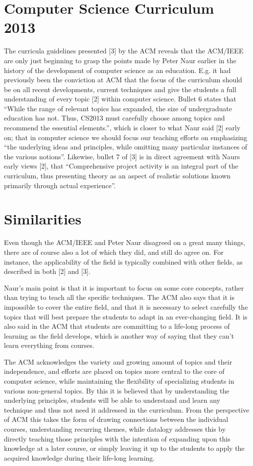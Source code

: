 \documentclass{article}
\begin{document}
\section{Computer Science Curriculum 2013}
The curricula guidelines presented [3] by the ACM reveals that the ACM/IEEE are only just beginning to grasp the points
made by Peter Naur earlier in the history of the development of computer science as an education. E.g. it had previously
been the conviction at ACM that the focus of the curriculum should be on all recent developments, current techniques and
give the students a full understanding of every topic [2] within computer science. Bullet 6 states that “While the range
of relevant topics has expanded, the size of undergraduate education has not. Thus, CS2013 must carefully choose among
topics and recommend the essential elements.”, which is closer to what Naur said [2] early on; that in computer science
we should focus our teaching efforts on emphasizing “the underlying ideas and principles, while omitting many particular
instances of the various notions”. Likewise, bullet 7 of [3] is in direct agreement with Naurs early views [2], that
“Comprehensive project activity is an integral part of the curriculum, thus presenting theory as an aspect of realistic
solutions known primarily through actual experience”.

\section{Similarities}
Even though the ACM/IEEE and Peter Naur disagreed on a great many things, there are of course also a lot of which they
did, and still do agree on. For instance, the applicability of the field is typically combined with other fields, as
described in both [2] and [3].

Naur’s main point is that it is important to focus on some core concepts, rather than trying to teach all the specific
techniques. The ACM also says that it is impossible to cover the entire field, and that it is necessary to select
carefully the topics that will best prepare the students to adapt in an ever-changing field. It is also said in the ACM
that students are committing to a life-long process of learning as the field develops, which is another way of saying
that they can’t learn everything from courses.

The ACM acknowledges the variety and growing amount of topics and their independence, and efforts are placed on topics
more central to the core of computer science, while maintaining the flexibility of specializing students in various
non-general topics. By this it is believed that by understanding the underlying principles, students will be able to
understand and learn any technique and thus not need it addressed in the curriculum. From the perspective of ACM this
takes the form of drawing connections between the individual courses, understanding recurring themes, while datalogy
addresses this by directly teaching those principles with the intention of expanding upon this knowledge at a later
course, or simply leaving it up to the students to apply the acquired knowledge during their life-long learning.
\end{document}
